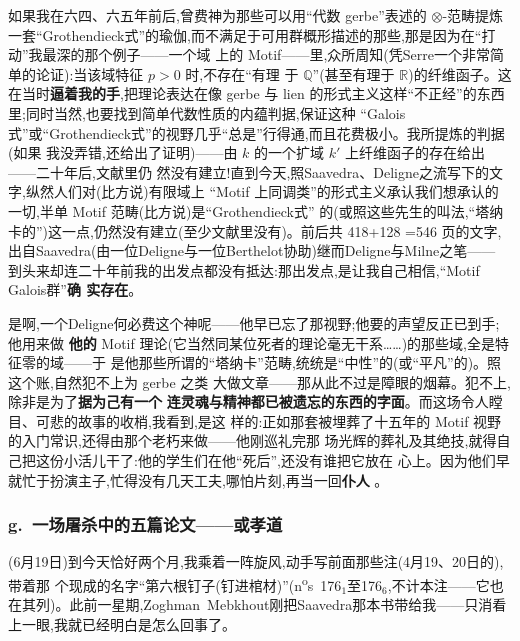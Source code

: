 如果我在六四、六五年前后,曾费神为那些可以用“代数 gerbe”表述的 $\otimes$-范畴提炼一套“Grothendieck式”的瑜伽,而不满足于可用群概形描述的那些,那是因为在“打动”我最深的那个例子——一个域
上的 Motif——里,众所周知(凭Serre一个非常简单的论证):当该域特征 $p>0$ 时,不存在“有理
于 $\mathbb{Q}$”(甚至有理于 $\mathbb{R}$)的纤维函子。这在当时\textbf{逼着我的手},把理论表达在像 gerbe
与 lien 的形式主义这样“不正经”的东西里;同时当然,也要找到简单代数性质的内蕴判据,保证这种
“Galois式”或“Grothendieck式”的视野几乎“总是”行得通,而且花费极小。我所提炼的判据(如果
我没弄错,还给出了证明)——由 $k$ 的一个扩域 $k'$ 上纤维函子的存在给出——二十年后,文献里仍
然没有建立!直到今天,照Saavedra、Deligne之流写下的文字,纵然人们对(比方说)有限域上
“Motif 上同调类”的形式主义承认我们想承认的一切,半单 Motif 范畴(比方说)是“Grothendieck式”
的(或照这些先生的叫法,“塔纳卡的”)这一点,仍然没有建立(至少文献里没有)。前后共 418+128
=546 页的文字,出自Saavedra(由一位Deligne与一位Berthelot协助)继而Deligne与Milne之笔——
到头来却连二十年前我的出发点都没有抵达:那出发点,是让我自己相信,“Motif Galois群”\textbf{确
实存在}。

是啊,一个Deligne何必费这个神呢——他早已忘了那视野;他要的声望反正已到手;他用来做
\textbf{他的} Motif 理论(它当然同某位死者的理论毫无干系……)的那些域,全是特征零的域——于
是他那些所谓的“塔纳卡”范畴,统统是“中性”的(或“平凡”的)。照这个账,自然犯不上为 gerbe 之类
大做文章\dmark{}——那从此不过是障眼的烟幕。犯不上,除非是为了\textbf{据为己有一个}
\textbf{连灵魂与精神都已被遗忘的东西的字面}。而这场令人瞠目、可悲的故事的收梢,我看到,是这
样的:正如那套被埋葬了十五年的 Motif 视野的入门常识,还得由那个老朽来做——他刚巡礼完那
场光辉的葬礼及其绝技,就得自己把这份小活儿干了:他的学生们在他“死后”,还没有谁把它放在
心上。因为他们早就忙于扮演主子,忙得没有几天工夫,哪怕片刻,再当一回\textbf{仆人}
。

\subsubsection{g.\ 一场屠杀中的五篇论文——或孝道}


(6月19日)到今天恰好两个月,我乘着一阵旋风,动手写前面那些注(4月19、20日的),带着那
个现成的名字“第六根钉子(钉进棺材)”(n\textsuperscript{o}s~176$_{1}$至176$_{6}$,不计本注——它也在其列)。此前一星期,Zoghman~Mebkhout刚把Saavedra那本书带给我——只消看上一眼,我就已经明白是怎么回事了。

